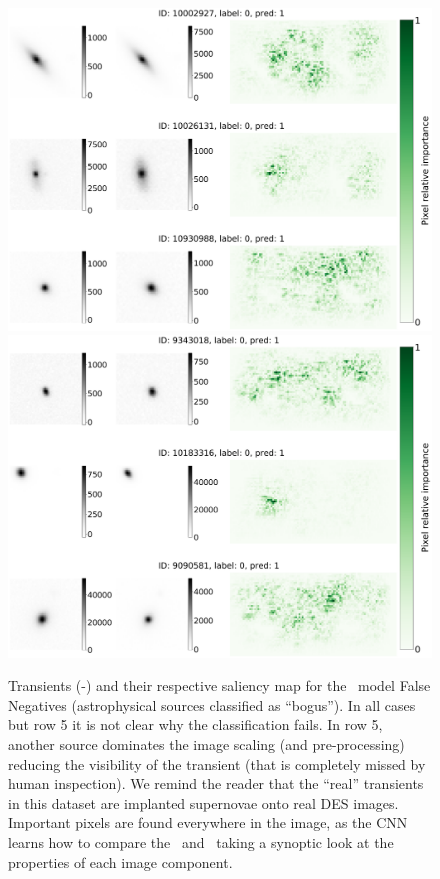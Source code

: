 \begin{figure}
    \centering
    \includegraphics[width=0.76\linewidth]{
    figures/saliency_plot_other3nodiaFN-see356.pdf}
    \includegraphics[width=0.76\linewidth]{
    figures/saliency_plot_other3nodiaFN-see981.pdf}
    \caption{
    Transients (\search-\temp) and their respective saliency map for the \nodia\ model False Negatives (astrophysical sources classified as ``bogus''). In all cases but row 5 it is not clear why the classification fails. In row 5, another source dominates the image scaling (and pre-processing) reducing the visibility of the transient (that is completely missed by human inspection). We remind the reader that the ``real'' transients in this dataset are implanted supernovae onto real DES images. Important pixels are found everywhere in the image, as the CNN learns how to compare the \diff\ and \temp\ taking a synoptic look at the properties of each image component.}
    \label{fig:fnndia}
\end{figure}



